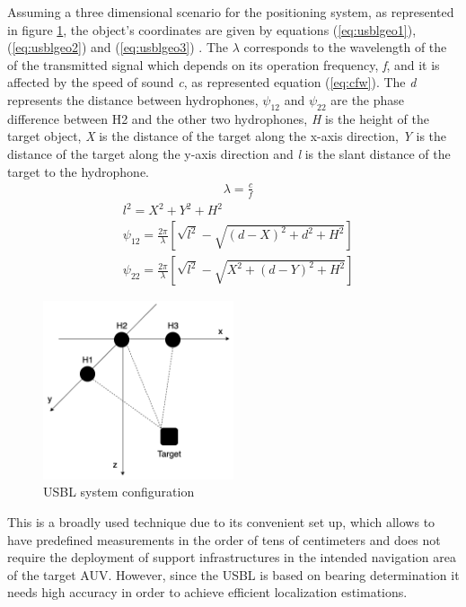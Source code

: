 Assuming a three dimensional scenario for the positioning system, as represented in figure \ref{fig:usblgeo}, the object's coordinates are given by equations (\ref{eq:usblgeo1}), (\ref{eq:usblgeo2}) and (\ref{eq:usblgeo3}) \cite{usbl-new}. The $\lambda$ corresponds to the wavelength of the of the transmitted signal which depends on its operation frequency, \textit{f}, and it is affected by the speed of sound \textit{c}, as represented equation (\ref{eq:cfw}).
The \textit{d} represents the distance between hydrophones, $\psi_{12}$ and $\psi_{22}$ are the phase difference between H2 and the other two hydrophones, \textit{H} is the height of the target object, \textit{X} is the distance of the target along the x-axis direction, \textit{Y} is the distance of the target along the y-axis direction and \textit{l} is the slant distance of the target to the hydrophone.
\begin{eqnarray}
& \lambda = \frac{c}{f}
\label{eq:cfw}
\end{eqnarray}
\begin{eqnarray}
& l^2 = X^2 + Y^2 + H^2 
\label{eq:usblgeo1}\\
& \psi_{12} = \frac{2\pi}{\lambda}[\sqrt{l^2} - \sqrt{(d-X)^2 + d^2 + H^2}]
\label{eq:usblgeo2}\\
& \psi_{22} = \frac{2\pi}{\lambda}[\sqrt{l^2} - \sqrt{X^2 + (d-Y)^2 + H^2}]
\label{eq:usblgeo3}
\end{eqnarray}

\begin{figure}[!htbp]
	\centering
	\includegraphics[width=0.5\textwidth]{figures/usbl-config}
	\caption{USBL system configuration}
	\label{fig:usblgeo}
\end{figure}

This is a broadly used technique due to its convenient set up, which allows to have predefined measurements in the order of tens of centimeters and does not require the deployment of support infrastructures in the intended navigation area of the target AUV. However, since the USBL is based on bearing determination it needs high accuracy in order to achieve efficient localization estimations.


